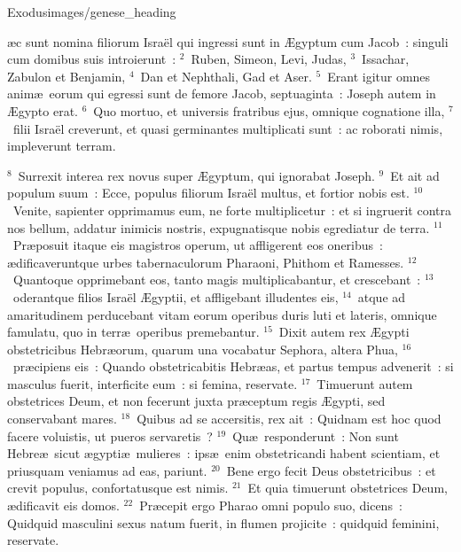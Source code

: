 {Exodus}{images/genese_heading}


\bchapter
{}\ae c sunt nomina filiorum Isra\"el qui ingressi sunt in \AE gyptum cum Jacob~: singuli cum domibus suis introierunt~:
${}^{2}$~Ruben, Simeon, Levi, Judas,
${}^{3}$~Issachar, Zabulon et Benjamin,
${}^{4}$~Dan et Nephthali, Gad et Aser.
${}^{5}$~Erant igitur omnes anim\ae\ eorum qui egressi sunt de femore Jacob, septuaginta~: Joseph autem in \AE gypto erat.
${}^{6}$~Quo mortuo, et universis fratribus ejus, omnique cognatione illa,
${}^{7}$~filii Isra\"el creverunt, et quasi germinantes multiplicati sunt~: ac roborati nimis, impleverunt terram.


${}^{8}$~Surrexit interea rex novus super \AE gyptum, qui ignorabat Joseph.
${}^{9}$~Et ait ad populum suum~: Ecce, populus filiorum Isra\"el multus, et fortior nobis est.
${}^{10}$~Venite, sapienter opprimamus eum, ne forte multiplicetur~: et si ingruerit contra nos bellum, addatur inimicis nostris, expugnatisque nobis egrediatur de terra.
${}^{11}$~Pr\ae posuit itaque eis magistros operum, ut affligerent eos oneribus~: \ae dificaveruntque urbes tabernaculorum Pharaoni, Phithom et Ramesses.
${}^{12}$~Quantoque opprimebant eos, tanto magis multiplicabantur, et crescebant~:
${}^{13}$~oderantque filios Isra\"el \AE gyptii, et affligebant illudentes eis,
${}^{14}$~atque ad amaritudinem perducebant vitam eorum operibus duris luti et lateris, omnique famulatu, quo in terr\ae\ operibus premebantur.
${}^{15}$~Dixit autem rex \AE gypti obstetricibus Hebr\ae orum, quarum una vocabatur Sephora, altera Phua,
${}^{16}$~pr\ae cipiens eis~: Quando obstetricabitis Hebr\ae as, et partus tempus advenerit~: si masculus fuerit, interficite eum~: si femina, reservate.
${}^{17}$~Timuerunt autem obstetrices Deum, et non fecerunt juxta pr\ae ceptum regis \AE gypti, sed conservabant mares.
${}^{18}$~Quibus ad se accersitis, rex ait~: Quidnam est hoc quod facere voluistis, ut pueros servaretis~?
${}^{19}$~Qu\ae\ responderunt~: Non sunt Hebre\ae\ sicut \ae gypti\ae\ mulieres~: ips\ae\ enim obstetricandi habent scientiam, et priusquam veniamus ad eas, pariunt.
${}^{20}$~Bene ergo fecit Deus obstetricibus~: et crevit populus, confortatusque est nimis.
${}^{21}$~Et quia timuerunt obstetrices Deum, \ae dificavit eis domos.
${}^{22}$~Pr\ae cepit ergo Pharao omni populo suo, dicens~: Quidquid masculini sexus natum fuerit, in flumen projicite~: quidquid feminini, reservate.

